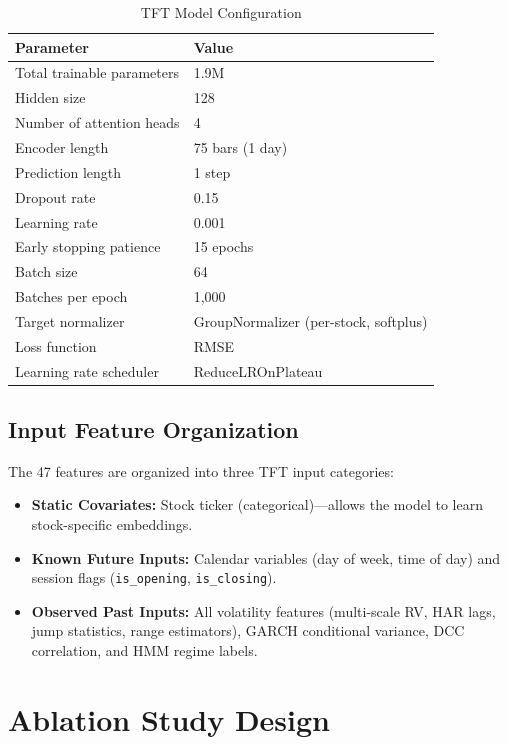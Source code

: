 \begin{table}[h!]
\caption{TFT Model Configuration}
\label{tab:config}
\centering
\begin{tabular}{ll}
\hline
\textbf{Parameter} & \textbf{Value} \\
\hline
Total trainable parameters & 1.9M \\
Hidden size & 128 \\
Number of attention heads & 4 \\
Encoder length & 75 bars (1 day) \\
Prediction length & 1 step \\
Dropout rate & 0.15 \\
Learning rate & 0.001 \\
Early stopping patience & 15 epochs \\
Batch size & 64 \\
Batches per epoch & 1,000 \\
Target normalizer & GroupNormalizer (per-stock, softplus) \\
Loss function & RMSE \\
Learning rate scheduler & ReduceLROnPlateau \\
\hline
\end{tabular}
\end{table}

\subsection{Input Feature Organization}

The 47 features are organized into three TFT input categories:

\begin{itemize}
    \item \textbf{Static Covariates:} Stock ticker (categorical)---allows the model to learn stock-specific embeddings.
    \item \textbf{Known Future Inputs:} Calendar variables (day of week, time of day) and session flags (\texttt{is\_opening}, \texttt{is\_closing}).
    \item \textbf{Observed Past Inputs:} All volatility features (multi-scale RV, HAR lags, jump statistics, range estimators), GARCH conditional variance, DCC correlation, and HMM regime labels.
\end{itemize}

\section{Ablation Study Design}

